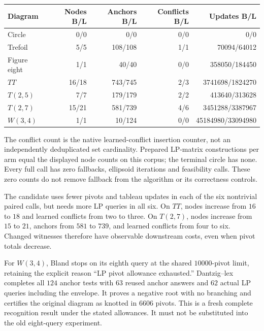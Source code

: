 \begin{center}
\small
\begin{tabular}{lrrrr}
\toprule
Diagram & Nodes B/L & Anchors B/L & Conflicts B/L & Updates B/L\\
\midrule
Circle & 0/0 & 0/0 & 0/0 & 0/0\\
Trefoil & 5/5 & 108/108 & 1/1 & 70094/64012\\
Figure eight & 1/1 & 40/40 & 0/0 & 358050/184450\\
$TT$ & 16/18 & 743/745 & 2/3 & 3741698/1824270\\
$T(2,5)$ & 7/7 & 179/179 & 2/2 & 413640/313628\\
$T(2,7)$ & 15/21 & 581/739 & 4/6 & 3451288/3387967\\
$W(3,4)$ & 1/1 & 10/124 & 0/0 & 45184980/33094980\\
\bottomrule
\end{tabular}
\end{center}

The conflict count is the native learned-conflict insertion counter, not
an independently deduplicated set cardinality.  Prepared LP-matrix constructions
per arm equal the displayed node counts on this corpus; the terminal circle
has none.  Every full call has zero fallbacks, ellipsoid iterations and
feasibility calls.  These zero counts do not remove fallback from the
algorithm or its correctness controls.

The candidate uses fewer pivots and tableau updates in each of the six
nontrivial paired calls, but needs more LP queries in all six.  On $TT$,
nodes increase from $16$ to $18$ and learned conflicts from two to three.
On $T(2,7)$, nodes increase from $15$ to $21$, anchors from $581$ to $739$,
and learned conflicts from four to six.  Changed witnesses therefore have
observable downstream costs, even when pivot totals decrease.

For $W(3,4)$, Bland stops on its eighth query at the shared $10000$-pivot
limit, retaining the explicit reason ``LP pivot allowance exhausted.''
Dantzig--lex completes all $124$ anchor tests with $63$ reused anchor answers
and $62$ actual LP queries including the envelope.  It proves a negative
root with no branching and certifies the original diagram as knotted in
$6606$ pivots.  This is a fresh complete recognition result under the stated
allowances.  It must not be substituted into the old eight-query experiment.

